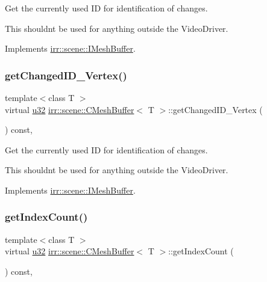 Get the currently used ID for identification of changes. 

This shouldn\textquotesingle{}t be used for anything outside the Video\+Driver. 

Implements \hyperlink{classirr_1_1scene_1_1IMeshBuffer_acc389d76856dfb06c3ba45a92315e6d8}{irr\+::scene\+::\+I\+Mesh\+Buffer}.

\mbox{\label{classirr_1_1scene_1_1CMeshBuffer_a99abc7d5f5a9f34221c58a598b33ce3a}} 
\subsubsection{\texorpdfstring{get\+Changed\+I\+D\+\_\+\+Vertex()}{getChangedID\_Vertex()}}
{\footnotesize\ttfamily template$<$class T $>$ \\
virtual \hyperlink{namespaceirr_a0416a53257075833e7002efd0a18e804}{u32} \hyperlink{classirr_1_1scene_1_1CMeshBuffer}{irr\+::scene\+::\+C\+Mesh\+Buffer}$<$ T $>$\+::get\+Changed\+I\+D\+\_\+\+Vertex (\begin{DoxyParamCaption}{ }\end{DoxyParamCaption}) const\hspace{0.3cm}{\ttfamily [inline]}, {\ttfamily [virtual]}}



Get the currently used ID for identification of changes. 

This shouldn\textquotesingle{}t be used for anything outside the Video\+Driver. 

Implements \hyperlink{classirr_1_1scene_1_1IMeshBuffer_aba48df31edf92a0117692c0be02298db}{irr\+::scene\+::\+I\+Mesh\+Buffer}.

\mbox{\label{classirr_1_1scene_1_1CMeshBuffer_ac5585f4983423a4ba1f4ab4aba112c95}} 
\subsubsection{\texorpdfstring{get\+Index\+Count()}{getIndexCount()}}
{\footnotesize\ttfamily template$<$class T $>$ \\
virtual \hyperlink{namespaceirr_a0416a53257075833e7002efd0a18e804}{u32} \hyperlink{classirr_1_1scene_1_1CMeshBuffer}{irr\+::scene\+::\+C\+Mesh\+Buffer}$<$ T $>$\+::get\+Index\+Count (\begin{DoxyParamCaption}{ }\end{DoxyParamCaption}) const\hspace{0.3cm}{\ttfamily [inline]}, {\ttfamily [virtual]}}



